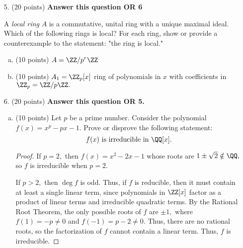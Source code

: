 \documentclass{article}
\begin{document}
\begin{itemize}
\begin{enumerate}[(a)]
		\end{enumerate}

		\newpage

	\item[5.] (20 points) \textbf{Answer this question OR 6}

		A \textit{local ring} $A$ is a commutative, unital ring with a unique maximal ideal. Which of the following rings is local? For each ring, show or provide a counterexample to the statement: "the ring is local."
		\begin{enumerate}[(a)]
			\item (10 points) $A=\ZZ/p^r\ZZ$

			\item (10 points) $A_1=\ZZ_p[x]$ ring of polynomials in $x$ with coefficients in $\ZZ_p=\ZZ/p\ZZ.$
				
		\end{enumerate}

		\newpage

	\item[6.] (20 points) \textbf{Answer this question OR 5.}
		\begin{enumerate}[(a)]
			\item (10 points) Let $p$ be a prime number. Consider the polynomial $f(x)=x^p-px-1.$ Prove or disprove the following statement:
				\[f(x)\text{ is irreducible in }\QQ[x].\]
				\begin{proof}
					If $p=2,$ then $f(x)=x^2-2x-1$ whose roots are $1\pm \sqrt{2}\notin \QQ,$ so $f$ is irreducible when $p=2.$ 

					If $p>2,$ then $\deg f$ is odd. Thus, if $f$ is reducible, then it must contain at least a single linear term, since polynomials in $\ZZ[x]$ factor as a product of linear terms and irreducible quadratic terms. By the Rational Root Theorem, the only possible roots of $f$ are $\pm 1,$ where $f(1)=-p\neq 0$ and $f(-1)=p-2\neq 0.$ Thus, there are no rational roots, so the factorization of $f$ cannot contain a linear term. Thus, $f$ is irreducible.
				\end{proof}


\end{enumerate}
\end{itemize}
\end{document}
